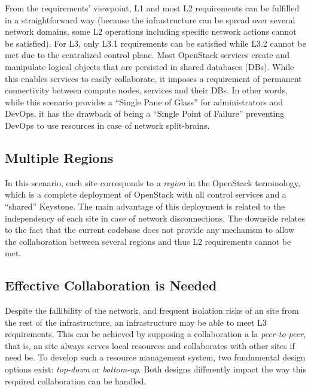 From the requirements' viewpoint, L1 and most L2 requirements can be
fulfilled in a straightforward way (because the infrastructure can be
spread over several network domains, some L2 operations including
specific network actions cannot be satisfied). For L3, only L3.1
requirements can be satisfied while L3.2  cannot be met due to
the centralized control plane. Most OpenStack services create and
manipulate logical objects that are persisted in shared databases
(DBs). While this enables services to easily collaborate, it imposes
a requirement of permanent connectivity between compute nodes, services and their
DBs.  In other words, while this scenario provides a ``Single Pane of
Glass'' for administrators and DevOps, it has the drawback of being a
``Single Point of Failure'' preventing DevOps to use \edge resources in
case of network split-brains.

\subsection{Multiple Regions}
In this scenario, each \edge site corresponds to a \emph{region}
in the OpenStack terminology, which is a complete deployment of
OpenStack with all control services and a ``shared'' Keystone.
The main advantage of this deployment is related to the independency
of each site in case of network disconnections.
The downside relates to the fact that the current codebase does not
provide any mechanism to allow the collaboration between several
regions and thus L2 requirements cannot be met.~


\subsection{Effective Collaboration is Needed}
Despite the fallibility of the network, and frequent isolation risks
of an \edge site from the rest of the infrastructure, an \edge
infrastructure may be able to meet L3 requirements. This can be
achieved by supposing a collaboration a la \emph{peer-to-peer},
that is, an \edge site always serves local resources and collaborates
with other \edge sites if need be. To develop such a resource
management system, two fundamental design options exist:
\emph{top-down} or \emph{bottom-up}. Both designs differently impact the way
this required collaboration can be handled.

